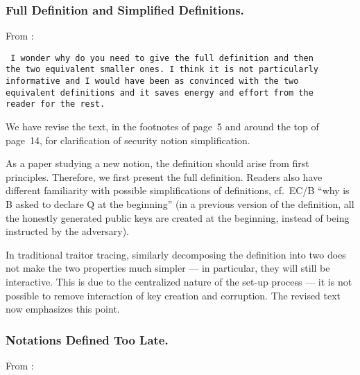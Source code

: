 
\subsubsection{Full Definition and Simplified Definitions.}
From :

\texttt{
I wonder why do you need to give the full definition and then \\
the two equivalent smaller ones. I think it is not particularly \\
informative and I would have been as convinced with the two \\
equivalent definitions and it saves energy and effort from the \\
reader for the rest.
}

We have revise the text,
in the footnotes of page~5
and
around the top of page~14,
for clarification of security notion simplification.

As a paper studying a new notion,
the definition should arise from first principles.
Therefore, we first present the full definition.
Readers also have different familiarity
with possible simplifications of definitions,
cf.~EC/B ``why is B asked to declare Q at the beginning''
(in a previous version of the definition,
all the honestly generated public keys are created at the beginning,
instead of being instructed by the adversary).

In traditional traitor tracing,
similarly decomposing the definition into two
does not make the two properties much simpler ---
in particular, they will still be interactive.
This is due to the centralized nature of the set-up process ---
it is not possible to remove interaction of key creation and corruption.
The revised text now emphasizes this point.

\subsubsection{Notations Defined Too Late.}
From :

